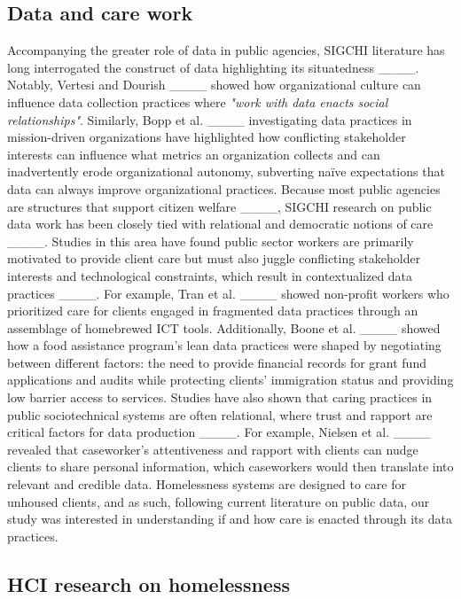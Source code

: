 \subsection{Data and care work}

Accompanying the greater role of data in public agencies, SIGCHI literature has long interrogated the construct of data highlighting its situatedness ____. Notably, Vertesi and Dourish ____ showed how organizational culture can influence data collection practices where \textit{"work with data enacts social relationships"}. Similarly, Bopp et al. ____ investigating data practices in mission-driven organizations have highlighted how conflicting stakeholder interests can influence what metrics an organization collects and can inadvertently erode organizational autonomy, subverting naïve expectations that data can always improve organizational practices. Because most public agencies are structures that support citizen welfare ____, SIGCHI research on public data work has been closely tied with relational and democratic notions of care ____. Studies in this area have found public sector workers are primarily motivated to provide client care but must also juggle conflicting stakeholder interests and technological constraints, which result in contextualized data practices ____. For example, Tran et al. ____ showed non-profit workers who prioritized care for clients engaged in fragmented data practices through an assemblage of homebrewed ICT tools. Additionally, Boone et al. ____ showed how a food assistance program's lean data practices were shaped by negotiating between different factors: the need to provide financial records for grant fund applications and audits while protecting clients' immigration status and providing low barrier access to services. Studies have also shown that caring practices in public sociotechnical systems are often relational, where trust and rapport are critical factors for data production ____. For example, Nielsen et al. ____ revealed that caseworker's attentiveness and rapport with clients can nudge clients to share personal information, which caseworkers would then translate into relevant and credible data. Homelessness systems are designed to care for unhoused clients, and as such, following current literature on public data, our study was interested in understanding if and how care is enacted through its data practices. 

 

\subsection{HCI research on homelessness}

